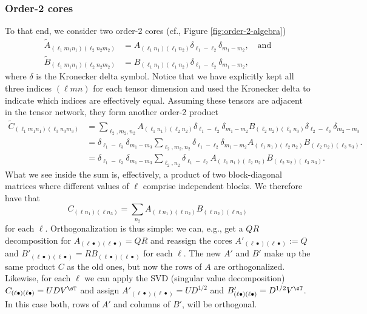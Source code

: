 \subsubsection{Order-2 cores}\label{sec:order-2-decompositions}
To that end, we consider two order-2 cores (cf., Figure \ref{fig:order-2-algebra})
\begin{align*}
\tilde{A}_{(\ell_1 m_1 n_1)(\ell_2 n_2 m_2)}
&= A_{(\ell_1 n_1)(\ell_1 n_2)} \delta_{\ell_1-\ell_2} \delta_{m_1-m_2},\quad\text{and}
\\
\tilde{B}_{(\ell_1 m_1 n_1)(\ell_2 n_2 m_2)}
&= B_{(\ell_1 n_1)(\ell_1 n_2)} \delta_{\ell_1-\ell_2} \delta_{m_1-m_2},
\end{align*}
where $\delta$ is the Kronecker delta symbol.
Notice that we have explicitly kept all three indices $(\ell m n)$ for each tensor dimension and used the Kronecker delta to indicate which indices are effectively equal.
Assuming these tensors are adjacent in the tensor network, they form another order-2 product
\begin{align*}
\tilde{C}_{(\ell_1 m_1 n_1)(\ell_3 n_3 m_3)}
&=
\sum_{\ell_2, m_2, n_2}
A_{(\ell_1 n_1)(\ell_2 n_2)} \delta_{\ell_1-\ell_2} \delta_{m_1-m_2}
B_{(\ell_2 n_2)(\ell_3 n_3)} \delta_{\ell_2-\ell_3} \delta_{m_2-m_3}
\\&=
\delta_{\ell_1-\ell_3}
\delta_{m_1-m_3}
\sum_{\ell_2, m_2, n_2}
\delta_{\ell_1-\ell_2}
\delta_{m_1-m_2}
A_{(\ell_1 n_1)(\ell_2 n_2)}
B_{(\ell_2 n_2)(\ell_3 n_3)}.
\\&=
\delta_{\ell_1-\ell_3}
\delta_{m_1-m_3}
\sum_{\ell_2, n_2}
\delta_{\ell_1-\ell_2}
A_{(\ell_1 n_1)(\ell_2 n_2)}
B_{(\ell_2 n_2)(\ell_3 n_3)}.
\end{align*}
What we see inside the sum is, effectively, a product of two block-diagonal matrices where different values of $\ell$ comprise independent blocks.
We therefore have that
\[
C_{(\ell n_1) (\ell n_3)} =
\sum_{n_2} A_{(\ell n_1) (\ell n_2)} B_{(\ell n_2) (\ell n_3)}
\]
for each $\ell$.
Orthogonalization is thus simple: we can, e.g., get a $QR$ decomposition for $A_{(\ell \bullet) (\ell \bullet)} = QR$ and reassign the cores $A'_{(\ell \bullet) (\ell \bullet)} := Q$ and $B'_{(\ell \bullet) (\ell \bullet)} = R B_{(\ell \bullet) (\ell \bullet)}$ for each $\ell$.
The new $A'$ and $B'$ make up the same product $C$ as the old ones, but now the rows of $A$ are orthogonalized.
Likewise, for each $\ell$ we can apply the SVD (singular value decomposition) $C_{(\ell \bullet) (\ell \bullet)} = U D V^\sT$ and assign
$A'_{(\ell \bullet) (\ell \bullet)} = U D^{1/2}$ and
$B'_{(\ell \bullet) (\ell \bullet)} = D^{1/2} V^\sT$.
In this case both, rows of $A'$ and columns of $B'$, will be orthogonal.

